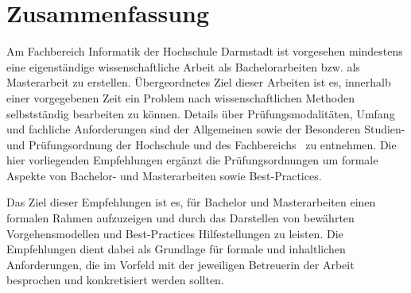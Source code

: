 \section*{Zusammenfassung}
%
Am Fachbereich Informatik der Hochschule Darmstadt ist vorgesehen mindestens eine eigenständige wissenschaftliche Arbeit als Bachelorarbeiten bzw. als Masterarbeit zu erstellen. Übergeordnetes Ziel dieser Arbeiten ist es, innerhalb einer vorgegebenen Zeit ein Problem nach wissenschaftlichen Methoden selbstständig bearbeiten zu können. Details über Prüfungsmodalitäten, Umfang und fachliche Anforderungen sind der Allgemeinen sowie der Besonderen Studien- und Prüfungsordnung der Hochschule und des Fachbereichs~\cite{} zu entnehmen. Die hier vorliegenden Empfehlungen ergänzt die Prüfungsordnungen um formale Aspekte von Bachelor- und Masterarbeiten sowie Best-Practices.
\smallskip

Das Ziel dieser Empfehlungen ist es, für Bachelor und Masterarbeiten einen formalen Rahmen aufzuzeigen und durch das Darstellen von bewährten Vorgehensmodellen und Best-Practices Hilfestellungen zu leisten. Die Empfehlungen dient dabei als Grundlage für formale und inhaltlichen Anforderungen, die im Vorfeld mit der jeweiligen Betreuerin der Arbeit besprochen und konkretisiert werden sollten.
